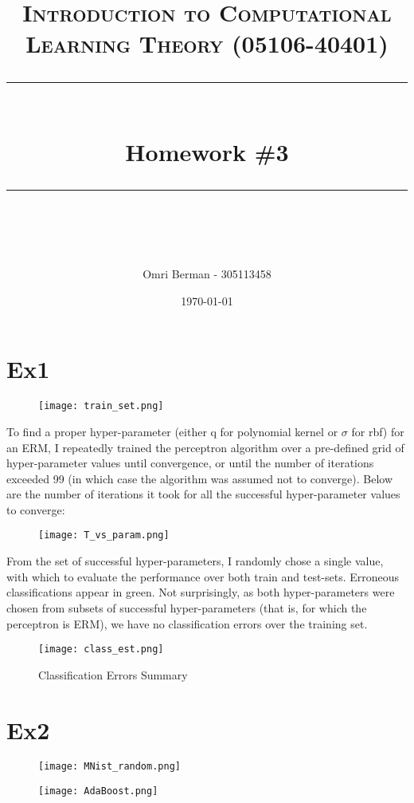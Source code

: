 \documentclass{article} %
\title{
\normalfont \normalsize 
\textsc{Introduction to Computational Learning Theory (05106-40401)} \\
[10pt] 
\rule{\linewidth}{0.5pt} \\[6pt] 
\huge Homework \#3 \\
\rule{\linewidth}{2pt}  \\[10pt]
}
\author{Omri Berman - 305113458}
\date{\normalsize \today}
\begin{document}
\maketitle
\noindent

\section*{Ex1}

\begin{figure}[H]
    \centering\texttt{[image: train\_set.png]}
\end{figure}

To find a proper hyper-parameter (either q for polynomial kernel or $\sigma$ for rbf) for an ERM, I repeatedly trained the perceptron algorithm over a pre-defined grid of hyper-parameter values until convergence, or until the number of iterations exceeded 99 (in which case the algorithm was assumed not to converge). Below are the number of iterations it took for all the successful hyper-parameter values to converge:

\begin{figure}[H]
    \centering\texttt{[image: T\_vs\_param.png]}
\end{figure}

From the set of successful hyper-parameters, I randomly chose a single value, with which to evaluate the performance over both train and test-sets. Erroneous classifications appear in green.
Not surprisingly, as both hyper-parameters were chosen from subsets of successful hyper-parameters (that is, for which the perceptron is ERM), we have no classification errors over the training set.

\begin{figure}[H]
    \centering\texttt{[image: class\_est.png]}
\end{figure}

\begin{figure}
    \centering{}
    \caption{Classification Errors Summary}
\end{figure}
\begin{center}
\end{center}

\section*{Ex2}
\begin{figure}[H]
    \texttt{[image: MNist\_random.png]}
\end{figure}

\begin{figure}[H]
    \texttt{[image: AdaBoost.png]}
\end{figure}
\end{document}

